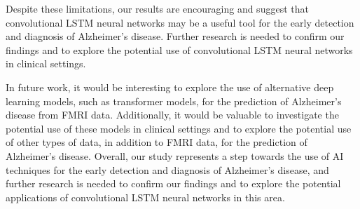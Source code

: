 \documentclass[10pt]{article}
\begin{document}
	Despite these limitations, our results are encouraging and suggest that convolutional LSTM neural networks may be a useful tool for the early detection and diagnosis of Alzheimer's disease. Further research is needed to confirm our findings and to explore the potential use of convolutional LSTM neural networks in clinical settings.

	In future work, it would be interesting to explore the use of alternative deep learning models, such as transformer models, for the prediction of Alzheimer's disease from FMRI data. Additionally, it would be valuable to investigate the potential use of these models in clinical settings and to explore the potential use of other types of data, in addition to FMRI data, for the prediction of Alzheimer's disease. Overall, our study represents a step towards the use of AI techniques for the early detection and diagnosis of Alzheimer's disease, and further research is needed to confirm our findings and to explore the potential applications of convolutional LSTM neural networks in this area.

    
	
	
\end{document}
